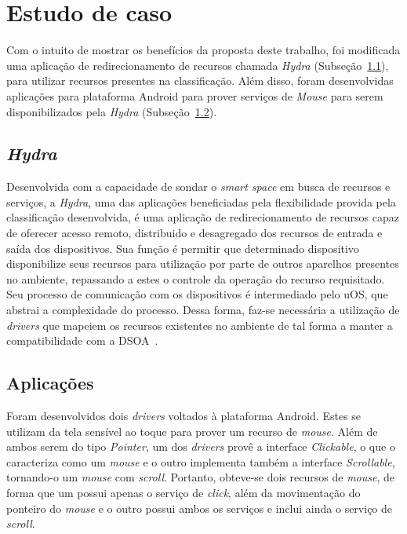 \section{Estudo de caso}
\label{sec:estudoDeCaso}

Com o intuito de mostrar os benefícios da proposta deste trabalho, foi modificada uma aplicação de redirecionamento de recursos chamada \emph{Hydra} (Subseção~\ref{subsec:Hydra}), para utilizar recursos presentes na classificação. Além disso, foram desenvolvidas aplicações para plataforma Android para prover serviços de \emph{Mouse} para serem disponibilizados pela \emph{Hydra} (Subseção~\ref{subsec:aplicacoes}).

\subsection{\emph{Hydra}}
\label{subsec:Hydra}

Desenvolvida com a capacidade de sondar o \emph{smart space} em busca de recursos e serviços, a \emph{Hydra}, uma das aplicações beneficiadas pela flexibilidade provida pela classificação desenvolvida, é uma aplicação de redirecionamento de recursos capaz de oferecer acesso remoto, distribuido e desagregado dos recursos de entrada e saída dos dispositivos. Sua função é permitir que determinado dispositivo disponibilize seus recursos para utilização por parte de outros aparelhos presentes no ambiente, repassando a estes o controle da operação do recurso requisitado. Seu processo de comunicação com os dispositivos é intermediado pelo uOS, que abstrai a complexidade do processo. Dessa forma, faz-se necessária a utilização de \emph{drivers} que mapeiem os recursos existentes no ambiente de tal forma a manter a compatibilidade com a DSOA~\cite{lucas2011}.

\subsection{Aplicações}
\label{subsec:aplicacoes}

Foram desenvolvidos dois \emph{drivers} voltados à plataforma Android. Estes se utilizam da tela sensível ao toque para prover um recurso de \emph{mouse}. Além de ambos serem do tipo \emph{Pointer}, um dos \emph{drivers} provê a interface \emph{Clickable}, o que o caracteriza como um \emph{mouse} e o outro implementa também a interface \emph{Scrollable}, tornando-o um \emph{mouse} com \emph{scroll}. Portanto, obteve-se dois recursos de \emph{mouse}, de forma que um possui apenas o serviço de \emph{click}, além da movimentação do ponteiro do \emph{mouse} e o outro possui ambos os serviços e inclui ainda o serviço de \emph{scroll}.

